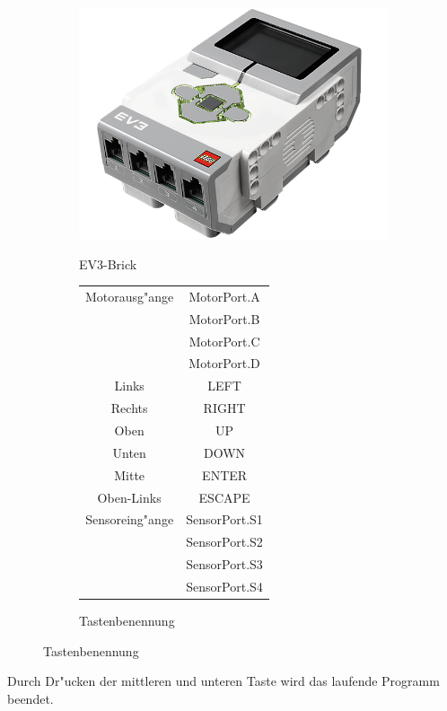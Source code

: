 	
	\begin{figure}[hptb]
		\begin{subfigure}{.65\textwidth}
			\includegraphics[width=\textwidth]{images/brick.png}
			\\
			\caption{EV3-Brick}
			\label{fig:g1}
		\end{subfigure}%
		\hfill
		\begin{subfigure}{.35\textwidth}
			\begin{tabular}{|c|c|} \hline
				Motorausg"ange & MotorPort.A \\
				&MotorPort.B\\
				&MotorPort.C\\
				&MotorPort.D\\ \hline
				Links & LEFT \\ \hline
				Rechts & RIGHT \\ \hline
				Oben & UP \\ \hline
				Unten & DOWN \\ \hline
				Mitte & ENTER \\ \hline
				Oben-Links & ESCAPE \\ \hline
				Sensoreing"ange & SensorPort.S1 \\
				&SensorPort.S2\\
				&SensorPort.S3\\
				&SensorPort.S4\\ \hline
			\end{tabular}
			\newline  \newline \newline \newline \newline
			\caption{Tastenbenennung}
			\label{fig:g2}
		\end{subfigure}
	\end{figure}
	
	Durch Dr"ucken der mittleren und unteren Taste wird das laufende Programm beendet.
	

